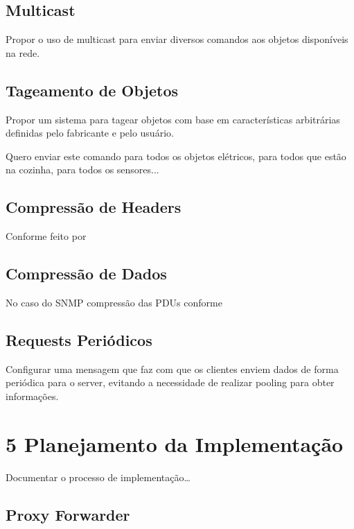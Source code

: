 \documentclass[twoside,english,brazilian]{UNISINOSmonografia}
\begin{document}
	
	\section{Multicast}
		
		Propor o uso de multicast para enviar diversos comandos aos objetos
		disponíveis na rede.
		
		
	\section{Tageamento de Objetos}
		
		Propor um sistema para tagear objetos com base em características
		arbitrárias definidas pelo fabricante e pelo usuário.
		
		Quero enviar este comando para todos os objetos elétricos, para
		todos que estão na cozinha, para todos os sensores...
		
		
	\section{Compressão de Headers}
		
		Conforme feito por \cite{Choi2009}
		
		
	\section{Compressão de Dados}
		
		No caso do SNMP compressão das PDUs conforme \cite{Choi2009}
		
		
	\section{Requests Periódicos}
		
		Configurar uma mensagem que faz com que os clientes enviem
		dados de forma periódica para o server, evitando a necessidade
		de realizar pooling para obter informações.
		\cite{Choi2009}
		
		
\chapter{5 Planejamento da Implementação}
	
	Documentar o processo de implementação\ldots
	
	\section{Proxy Forwarder}
		
\end{document}
